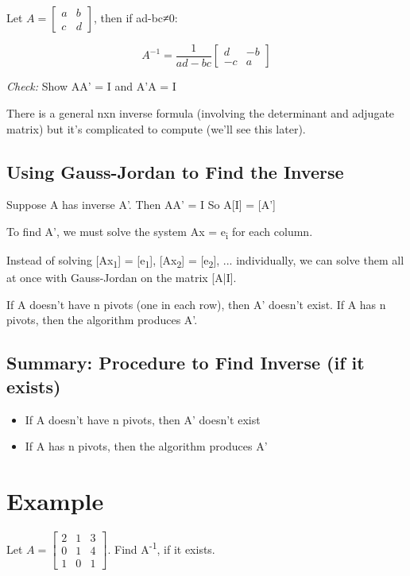 \documentclass[12pt,a4paper]{article}
\begin{document}
Let $A = \begin{bmatrix} a & b \\ c & d \end{bmatrix}$, then if ad-bc≠0:

\[
A^{-1} = \frac{1}{ad-bc} \begin{bmatrix} d & -b \\ -c & a \end{bmatrix}
\]

\textit{Check:} Show AA' = I and A'A = I

There is a general nxn inverse formula (involving the determinant and adjugate matrix) but it's complicated to compute (we'll see this later).

\subsection{Using Gauss-Jordan to Find the Inverse}

Suppose A has inverse A'.
Then AA' = I
So A[I] = [A']

To find A', we must solve the system Ax = e\textsubscript{i} for each column.

Instead of solving [Ax\textsubscript{1}] = [e\textsubscript{1}], [Ax\textsubscript{2}] = [e\textsubscript{2}], ... individually, we can solve them all at once with Gauss-Jordan on the matrix [A|I].

If A doesn't have n pivots (one in each row), then A' doesn't exist.
If A has n pivots, then the algorithm produces A'.

\subsection{Summary: Procedure to Find Inverse (if it exists)}

\begin{itemize}
    \item If A doesn't have n pivots, then A' doesn't exist
    \item If A has n pivots, then the algorithm produces A'
\end{itemize}

\section{Example}

Let $A = \begin{bmatrix} 2 & 1 & 3 \\ 0 & 1 & 4 \\ 1 & 0 & 1 \end{bmatrix}$. Find A\textsuperscript{-1}, if it exists.
\end{document}
